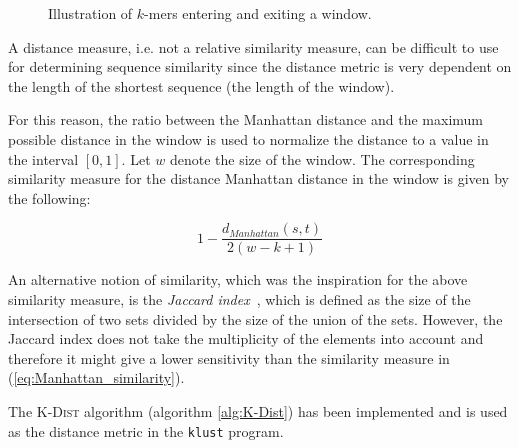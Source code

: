 \begin{figure}[H]
\centering
{}
\caption{Illustration of $k$-mers entering and exiting a window.}
\label{fig:d2_forward_differences}
\end{figure}

A distance measure, i.e. not a relative similarity measure, can be difficult to
use for determining sequence similarity since the distance metric is very
dependent on the length of the shortest sequence (the length of the window).

For this reason, the ratio between the Manhattan distance and the maximum
possible distance in the window is used to normalize the distance to a value in
the interval $[0,1]$. Let $w$ denote the size of the window. The corresponding
similarity measure for the distance Manhattan distance in the window is given
by the following:

\begin{equation}
  1 - \frac{d_{Manhattan}(s,t)}{2(w - k + 1)} \label{eq:Manhattan_similarity}
\end{equation}

An alternative notion of similarity, which was the inspiration for the above
similarity measure, is the \emph{Jaccard index}~\cite{jaccard1912}, which is
defined as the size of the intersection of two sets divided by the size of the
union of the sets.  However, the Jaccard index does not take the multiplicity
of the elements into account and therefore it might give a lower sensitivity
than the similarity measure in (\ref{eq:Manhattan_similarity}).

The \textsc{K-Dist} algorithm (algorithm \ref{alg:K-Dist}) has been implemented
and is used as the distance metric in the \texttt{klust} program.

